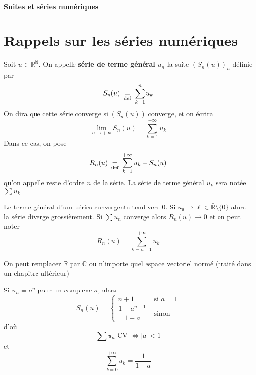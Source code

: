 \ifsolo
    ~

    \vspace{1cm}

    \begin{center}
        \textbf{\LARGE Suites et séries numériques} \\[1em]
    \end{center}
    \tableofcontents
\else
    \minitoc
\fi
\thispagestyle{empty}

\ifsolo \newpage \setcounter{page}{1} \fi

\section{Rappels sur les séries numériques}

\begin{dfn}
    Soit $u\in\mathbb R^{\mathbb N}$. On appelle \textbf{série de terme général} $u_n$ la suite $(S_n(u))_n$ définie par \[
        S_n(u)\;\underset{\text{def}}=\; \sum_{k=1}^nu_k
    \]
    On dira que cette série converge si $(S_n(u))$ converge, et on écrira \[
        \lim_{n\to+\infty}S_n(u)=\sum_{k=1}^{+\infty}u_k
    \]
    Dans ce cas, on pose \[
        R_n(u)\;\underset{\text{def}}=\;\sum_{k=1}^{+\infty}u_k-S_n(u)
    \]
    qu'on appelle reste d'ordre $n$ de la série. La série de terme général $u_k$ sera notée $\sum u_k$
\end{dfn}


\begin{rem}
    Le terme général d'une séries convergente tend vers $0$. Si $u_n\longrightarrow \ell\in\bar{ \mathbb R}\setminus\{0\}$ alors la série diverge grossièrement. Si $\sum u_n$ converge alors $R_n(u)\longrightarrow0$ et on peut noter \[
        R_n(u)=\sum_{k=n+1}^{+\infty}u_k
    \]
\end{rem}

\begin{rem}
    On peut remplacer $\mathbb R$ par $\mathbb C$ ou n'importe quel espace vectoriel normé (traité dans un chapitre ultérieur)
\end{rem}

\begin{ex}
    Si $u_n=a^n$ pour un complexe $a$, alors \[
        S_n(u)= \begin{cases}
            n+1 &\text{ si }a=1\\[1em]
            \dfrac{1-a^{n+1}}{1-a}&\text{ sinon}
        \end{cases}
    \]
    d'où \[
        \sum u_n\text{ CV }\iff |a|<1
    \]
    et \[
        \sum_{k=0}^{+\infty}u_k=\frac1{1-a}
    \]
\end{ex}


